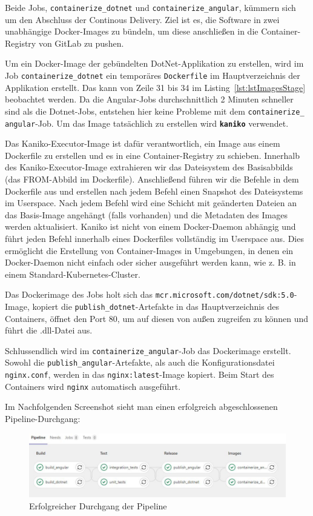 Beide Jobs, \texttt{containerize\_dotnet} und \texttt{containerize\_angular}, kümmern sich um den Abschluss der Continous Delivery. Ziel ist es, die Software in zwei unabhängige Docker-Images zu bündeln, um diese anschließen in die Container-Registry von GitLab zu pushen.

Um ein Docker-Image der gebündelten DotNet-Applikation zu  erstellen, wird im Job \texttt{containerize\_dotnet} ein temporäres \texttt{Dockerfile} im Hauptverzeichnis der Applikation erstellt. Das kann von Zeile 31 bis 34 im Listing~\ref{lst:lstImagesStage} beobachtet werden. Da die Angular-Jobs durchschnittlich 2 Minuten schneller sind als die Dotnet-Jobs, entstehen hier keine Probleme mit dem \texttt{containerize\_\\angular}-Job. Um das Image tatsächlich zu erstellen wird \textbf{\texttt{kaniko}} verwendet.

Das Kaniko-Executor-Image ist dafür verantwortlich, ein Image aus einem Dockerfile zu erstellen und es in eine Container-Registry zu schieben. Innerhalb des Kaniko-Executor-Image extrahieren wir das Dateisystem des Basisabbilds (das FROM-Abbild im Dockerfile). Anschließend führen wir die Befehle in dem Dockerfile aus und erstellen nach jedem Befehl einen Snapshot des Dateisystems im Userspace. Nach jedem Befehl wird eine Schicht mit geänderten Dateien an das Basis-Image angehängt (falls vorhanden) und die Metadaten des Images werden aktualisiert\cite{kaniko}. Kaniko ist nicht von einem Docker-Daemon abhängig und führt jeden Befehl innerhalb eines Dockerfiles vollständig im Userspace aus. Dies ermöglicht die Erstellung von Container-Images in Umgebungen, in denen ein Docker-Daemon nicht einfach oder sicher ausgeführt werden kann, wie z. B. in einem Standard-Kubernetes-Cluster.\cite{kaniko}

Das Dockerimage des Jobs holt sich das \texttt{mcr.microsoft.com/dotnet/sdk:5.0}-Image, kopiert die \texttt{publish\_dotnet}-Artefakte in das Hauptverzeichnis des Containers, öffnet den Port 80, um auf diesen von außen zugreifen zu können und führt die .dll-Datei aus.

Schlussendlich wird im \texttt{containerize\_angular}-Job das Dockerimage erstellt. Sowohl die \texttt{publish\_angular}-Artefakte, als auch die Konfigurationsdatei \texttt{nginx.conf}, werden in das \texttt{nginx:latest}-Image kopiert. Beim Start des Containers wird \texttt{nginx} automatisch ausgeführt.

Im Nachfolgenden Screenshot sieht man einen erfolgreich abgeschlossenen Pipeline-Durchgang:

\begin{figure}[H]
	\centerline{
		\includegraphics[width=1\textwidth, frame]{./grafiken/build_test_release_successful.JPG}
	}
	\vskip0pt
	\caption{Erfolgreicher Durchgang der Pipeline}
\end{figure}